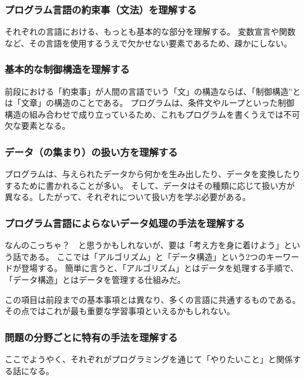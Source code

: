 \documentclass[lualatex,ja=standard,12pt,a4j]{bxjsbook}
\begin{document}
			\subsubsection{プログラム言語の約束事（文法）を理解する}
                それぞれの言語における、もっとも基本的な部分を理解する。
                変数宣言や関数など、その言語を使用するうえで欠かせない要素であるため、疎かにしない。
			
			\subsubsection{基本的な制御構造を理解する}
				前段における「約束事」が人間の言語でいう「文」の構造ならば、「制御構造”とは「文章」の構造のことである。
                プログラムは、条件文やループといった制御構造の組み合わせで成り立っているため、これもプログラムを書くうえでは不可欠な要素となる。
                
			\subsubsection{データ（の集まり）の扱い方を理解する}
				プログラムは、与えられたデータから何かを生み出したり、データを変換したりするために書かれることが多い。
                そして、データはその種類に応じて扱い方が異なる。したがって、それぞれについて扱い方を学ぶ必要がある。
				
			\subsubsection{プログラム言語によらないデータ処理の手法を理解する}
				なんのこっちゃ？　と思うかもしれないが、要は「考え方を身に着けよう」という話である。
                ここでは「アルゴリズム」と「データ構造」という2つのキーワードが登場する。
                簡単に言うと、「アルゴリズム」とはデータを処理する手順で、「データ構造」とはデータを管理する仕組みだ。
                
                この項目は前段までの基本事項とは異なり、多くの言語に共通するものである。
                その点ではこれが最も重要な学習事項といえるかもしれない。
				
			\subsubsection{問題の分野ごとに特有の手法を理解する}
                ここでようやく、それぞれがプログラミングを通じて「やりたいこと」と関係する話になる。
                
\end{document}
